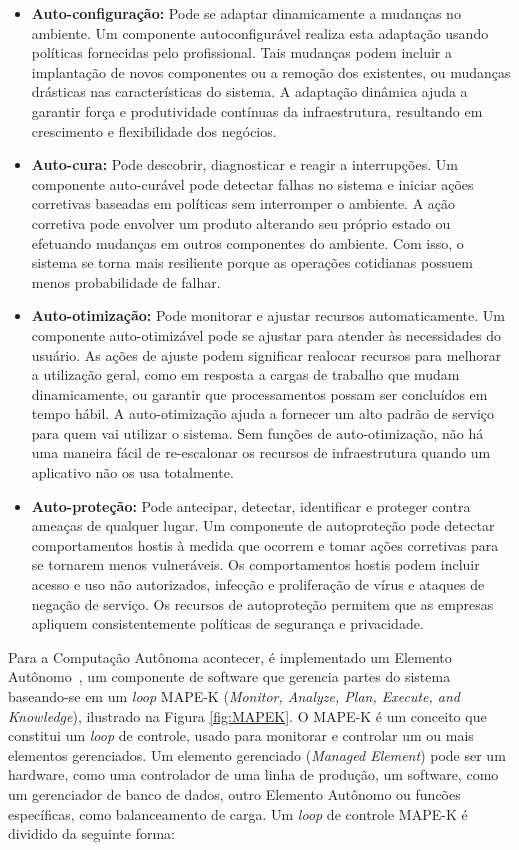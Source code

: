\documentclass[portugues]{ic-tese}
\begin{document}
\begin{itemize}
\item \textbf{Auto-configuração:} Pode se adaptar dinamicamente a mudanças no ambiente. Um componente autoconfigurável realiza esta adaptação usando políticas fornecidas pelo profissional. Tais mudanças podem incluir a implantação de novos componentes ou a remoção dos existentes, ou mudanças drásticas nas características do sistema. A adaptação dinâmica ajuda a garantir força e produtividade contínuas da infraestrutura, resultando em crescimento e flexibilidade dos negócios.
\item \textbf{Auto-cura:} Pode descobrir, diagnosticar e reagir a interrupções. Um componente auto-curável pode detectar falhas no sistema e iniciar ações corretivas baseadas em políticas sem interromper o ambiente. A ação corretiva pode envolver um produto alterando seu próprio estado ou efetuando mudanças em outros componentes do ambiente. Com isso, o sistema se torna mais resiliente porque as operações cotidianas possuem menos probabilidade de falhar.
\item \textbf{Auto-otimização:} Pode monitorar e ajustar recursos automaticamente. Um componente auto-otimizável pode se ajustar para atender às necessidades do usuário. As ações de ajuste podem significar realocar recursos para melhorar a utilização geral, como em resposta a cargas de trabalho que mudam dinamicamente, ou garantir que processamentos possam ser concluídos em tempo hábil. A auto-otimização ajuda a fornecer um alto padrão de serviço para quem vai utilizar o sistema. Sem funções de auto-otimização, não há uma maneira fácil de re-escalonar os recursos de infraestrutura quando um aplicativo não os usa totalmente.
\item \textbf{Auto-proteção:} Pode antecipar, detectar, identificar e proteger contra ameaças de qualquer lugar. Um componente de autoproteção pode detectar comportamentos hostis à medida que ocorrem e tomar ações corretivas para se tornarem menos vulneráveis. Os comportamentos hostis podem incluir acesso e uso não autorizados, infecção e proliferação de vírus e ataques de negação de serviço. Os recursos de autoproteção permitem que as empresas apliquem consistentemente políticas de segurança e privacidade.
\end{itemize}

Para a Computação Autônoma acontecer, é implementado um Elemento Autônomo~\citep{Abbas_2010}, um componente de software que gerencia partes do sistema baseando-se em um \textit{loop} MAPE-K (\textit{Monitor, Analyze, Plan, Execute, and Knowledge}), ilustrado na Figura \ref{fig:MAPEK}. O MAPE-K é um conceito que constitui um \textit{loop} de controle, usado para monitorar e controlar um ou mais elementos gerenciados. Um elemento gerenciado (\textit{Managed Element}) pode ser um hardware, como uma controlador de uma linha de produção, um software, como um gerenciador de banco de dados, outro Elemento Autônomo ou funcões específicas, como balanceamento de carga. Um \textit{loop} de controle MAPE-K é dividido da seguinte forma:
\end{document}
